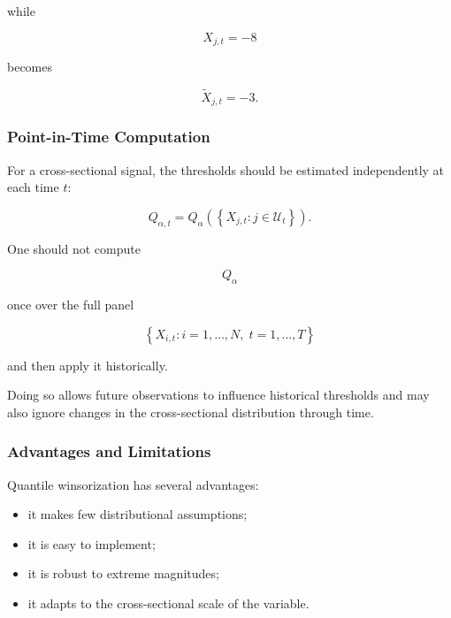 \documentclass[11pt,a4paper]{article}
\begin{document}
while

\begin{equation}
X_{j,t}=-8
\end{equation}

becomes

\begin{equation}
\widetilde{X}_{j,t}=-3.
\end{equation}


\subsubsection{Point-in-Time Computation}

For a cross-sectional signal, the thresholds should be estimated independently
at each time $t$:

\begin{equation}
Q_{\alpha,t}
=
Q_{\alpha}
\left(
\left\{
X_{j,t}
:
j\in\mathcal{U}_t
\right\}
\right).
\end{equation}

One should not compute

\begin{equation}
Q_{\alpha}
\end{equation}

once over the full panel

\begin{equation}
\left\{
X_{i,t}
:
i=1,\ldots,N,
\;
t=1,\ldots,T
\right\}
\end{equation}

and then apply it historically.

Doing so allows future observations to influence historical thresholds and may
also ignore changes in the cross-sectional distribution through time.


\subsubsection{Advantages and Limitations}

Quantile winsorization has several advantages:

\begin{itemize}
    \item it makes few distributional assumptions;
    \item it is easy to implement;
    \item it is robust to extreme magnitudes;
    \item it adapts to the cross-sectional scale of the variable.
\end{itemize}
\end{document}
